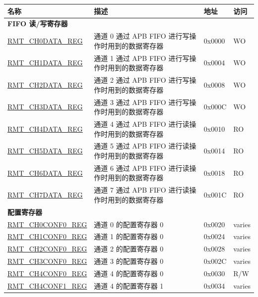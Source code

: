 \begin{longtable}{ | p{5.5cm} | p{6.5cm} | p{1.3cm} | p{1.8cm} | }
\hline\rowcolor{lightgray}
\textbf{名称} & \textbf{描述} & \textbf{地址} & \textbf{访问} \\ \hline
\endhead
\multicolumn{4}{|l|}{\textbf{FIFO 读/写寄存器}} \\ \hline
\hyperref[regdesc:RMTCHNDATAREG]{RMT\_CH0DATA\_REG} & 通道 0 通过 APB FIFO 进行写操作时用到的数据寄存器 & 0x0000 & WO \\ \hline
\hyperref[regdesc:RMTCHNDATAREG]{RMT\_CH1DATA\_REG} & 通道 1 通过 APB FIFO 进行写操作时用到的数据寄存器 & 0x0004 & WO \\ \hline
\hyperref[regdesc:RMTCHNDATAREG]{RMT\_CH2DATA\_REG} & 通道 2 通过 APB FIFO 进行写操作时用到的数据寄存器 & 0x0008 & WO \\ \hline
\hyperref[regdesc:RMTCHNDATAREG]{RMT\_CH3DATA\_REG} & 通道 3 通过 APB FIFO 进行写操作时用到的数据寄存器 & 0x000C & WO \\ \hline
\hyperref[regdesc:RMTCHMDATAREG]{RMT\_CH4DATA\_REG} & 通道 4 通过 APB FIFO 进行读操作时用到的数据寄存器 & 0x0010 & RO \\ \hline
\hyperref[regdesc:RMTCHMDATAREG]{RMT\_CH5DATA\_REG} & 通道 5 通过 APB FIFO 进行读操作时用到的数据寄存器 & 0x0014 & RO \\ \hline
\hyperref[regdesc:RMTCHMDATAREG]{RMT\_CH6DATA\_REG} & 通道 6 通过 APB FIFO 进行读操作时用到的数据寄存器 & 0x0018 & RO \\ \hline
\hyperref[regdesc:RMTCHMDATAREG]{RMT\_CH7DATA\_REG} & 通道 7 通过 APB FIFO 进行读操作时用到的数据寄存器 & 0x001C & RO \\ \hline
\multicolumn{4}{|l|}{\textbf{配置寄存器}} \\ \hline
\hyperref[regdesc:RMTCHNCONF0REG]{RMT\_CH0CONF0\_REG} & 通道 0 的配置寄存器 0 & 0x0020 & varies \\ \hline
\hyperref[regdesc:RMTCHNCONF0REG]{RMT\_CH1CONF0\_REG} & 通道 1 的配置寄存器 0 & 0x0024 & varies \\ \hline
\hyperref[regdesc:RMTCHNCONF0REG]{RMT\_CH2CONF0\_REG} & 通道 2 的配置寄存器 0 & 0x0028 & varies \\ \hline
\hyperref[regdesc:RMTCHNCONF0REG]{RMT\_CH3CONF0\_REG} & 通道 3 的配置寄存器 0 & 0x002C & varies \\ \hline
\hyperref[regdesc:RMTCHMCONF0REG]{RMT\_CH4CONF0\_REG} & 通道 4 的配置寄存器 0 & 0x0030 & R/W \\ \hline
\hyperref[regdesc:RMTCHMCONF1REG]{RMT\_CH4CONF1\_REG} & 通道 4 的配置寄存器 1 & 0x0034 & varies \\ \hline

\end{longtable}
